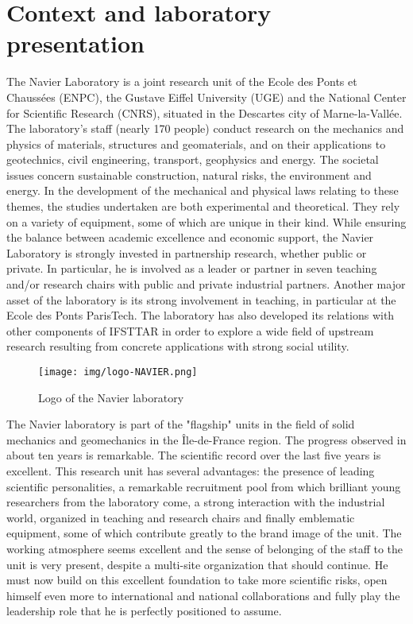 \documentclass[12pt]{article}
\begin{document}
\newpage
\section{Context and laboratory presentation}

The Navier Laboratory is a joint research unit of the Ecole des Ponts et Chaussées (ENPC), the Gustave Eiffel University (UGE) and the National Center for Scientific Research (CNRS), situated in the Descartes city of Marne-la-Vallée. The laboratory's staff (nearly 170 people) conduct research on the mechanics and physics of materials, structures and geomaterials, and on their applications to geotechnics, civil engineering, transport, geophysics and energy. The societal issues concern sustainable construction, natural risks, the environment and energy. In the development of the mechanical and physical laws relating to these themes, the studies undertaken are both experimental and theoretical. They rely on a variety of equipment, some of which are unique in their kind. While ensuring the balance between academic excellence and economic support, the Navier Laboratory is strongly invested in partnership research, whether public or private. In particular, he is involved as a leader or partner in seven teaching and/or research chairs with public and private industrial partners. Another major asset of the laboratory is its strong involvement in teaching, in particular at the Ecole des Ponts ParisTech. The laboratory has also developed its relations with other components of IFSTTAR in order to explore a wide field of upstream research resulting from concrete applications with strong social utility.

\begin{figure}[H]
    \centering
    \texttt{[image: img/logo-NAVIER.png]}
    \caption{Logo of the Navier laboratory}
\end{figure}

The Navier laboratory is part of the "flagship" units in the field of solid mechanics and geomechanics in the Île-de-France region. The progress observed in about ten years is remarkable. The scientific record over the last five years is excellent. This research unit has several advantages: the presence of leading scientific personalities, a remarkable recruitment pool from which brilliant young researchers from the laboratory come, a strong interaction with the industrial world, organized in teaching and research chairs and finally emblematic equipment, some of which contribute greatly to the brand image of the unit. The working atmosphere seems excellent and the sense of belonging of the staff to the unit is very present, despite a multi-site organization that should continue. He must now build on this excellent foundation to take more scientific risks, open himself even more to international and national collaborations and fully play the leadership role that he is perfectly positioned to assume.
\end{document}
